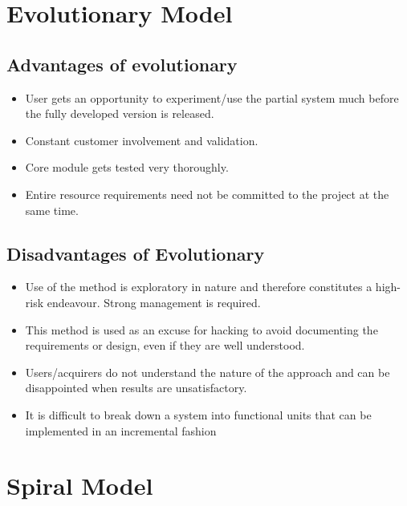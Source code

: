 \documentclass{article}
\begin{document}
\newpage{}
\section{Evolutionary Model}
\subsection{Advantages of evolutionary}
\begin{itemize}
\item        User gets an opportunity to experiment/use the partial system much before the fully developed version is released.
\item        Constant customer involvement and validation.
\item        Core module gets tested very thoroughly.
\item        Entire resource requirements need not be committed to the project at the same time.
\end{itemize}

\subsection{Disadvantages of Evolutionary}
\begin{itemize}
\item        Use of the method is exploratory in nature and therefore constitutes a high-risk endeavour. Strong management is required.
\item        This method is used as an excuse for hacking to avoid documenting the requirements or design, even if they are well understood. 
\item        Users/acquirers do not understand the nature of the approach and can be disappointed when results are unsatisfactory.
\item        It is difficult to break down a system into functional units that can be implemented in an incremental fashion
\end{itemize}

\newpage{}
\section{Spiral Model}
\end{document}
